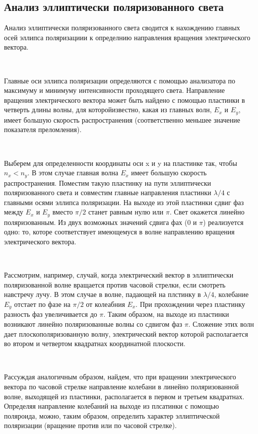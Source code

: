 \documentclass[12pt,a4paper]{article}
\begin{document}
 \subsection{Анализ эллиптически поляризованного света}
 Анализ эллиптически поляризованного света сводится к нахождению главных осей эллипса поляризациии к определнию направления вращения электрического вектора.
 
 \

 Главные оси эллипса поляризации определяются с помощью анализатора по максимуму и минимуму интенсивности проходящего света. Направление вращения электрического вектора может быть найдено с помощью пластинки в четверть длины волны, для которойизвестно, какая из главных волн, $E_x$ и $E_y$, имеет большую скорость распространения (соответственно меньшее значение показателя преломления).

\

Выберем для определенности координаты оси x и  y на пластинке так, чтобы $n_x < n_y$. В этом случае главная волна $E_x$ имеет большую скорость распространения. Поместим такую пластинку на пути эллиптически поляризованного света и совместим главные направления пластинки $\lambda/4$ с главными осями эллипса поляризации. На выходе из этой пластинки сдвиг фаз между $E_x$  и $E_y$ вместо $\pi/2$ станет равным нулю или $\pi$. Свет окажется линейно поляризованным. Из двух возможных значений сдвига фах (0 и $\pi$) реализуется одно: то, которе соответствует имеющемуся в волне направлению вращения электрического вектора.

\  

Рассмотрим, например, случай, когда электрический вектор в эллиптически поляризованной волне вращается против часовой стрелки, если смотреть навстречу лучу. В этом случае в волне, падающей на плстинку в $\lambda/4$, колебание $E_y$ отстает по фазе на $\pi/2$ от колеабния $E_x$. При прохождении через
 пластинку разность фаз увеличивается до $\pi$. Таким образом, на выходе из пластинки возникают линейно поляризованные волны со сдвигом фаз $\pi$. Сложение этих волн дает плоскополяризованную волну, электрический вектор которой располагается во втором и четвертом квадратнах координатной плоскости.

 \

Рассуждая аналогичным образом, найдем, что при вращении электрического вектора по часовой стрелке направление колебани в линейно поляризованной волне, выходящей из пластинки,
располагается в первом и третьем квадратнах. Определяя направление колебаний на выходе из плсатинки с помощью поляроида, можно, таким образом, определить характер эллиптической поляризации (вращение против или по часовой стрелке). 
\end{document}
